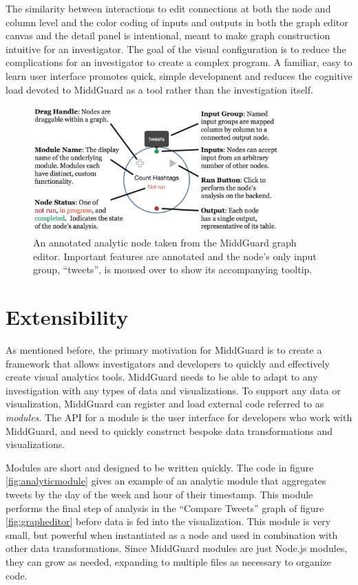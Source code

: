 \documentclass[midd]{thesis}
\begin{document}
The similarity between interactions to edit connections at both the node and
column level and the color coding of inputs and outputs in both the graph editor
canvas and the detail panel is intentional, meant to make graph construction
intuitive for an investigator. The goal of the visual configuration is to reduce
the complications for an investigator to create a complex program. A familiar,
easy to learn user interface promotes quick, simple development and reduces the
cognitive load devoted to MiddGuard as a tool rather than the investigation
itself.

\begin{figure}[!ht]
  \centering
  \includegraphics[width=0.85\textwidth]{middguard-analytic-node-annotated}
  \caption[An annotated analytic node.]{An annotated analytic node taken from
  the MiddGuard graph editor. Important features are annotated and the node's
  only input group, ``tweets'', is moused over to show its accompanying
  tooltip.}
  \label{fig:annotatednode}
\end{figure}

\section{Extensibility}

As mentioned before, the primary motivation for MiddGuard is to create a
framework that allows investigators and developers to quickly and effectively
create visual analytics tools. MiddGuard needs to be able to adapt to any
investigation with any types of data and visualizations. To support any data or
visualization, MiddGuard can register and load external code referred to as
\textit{modules}. The API for a module is the user interface for developers who
work with MiddGuard, and need to quickly construct bespoke data transformations
and visualizations.

Modules are short and designed to be written quickly. The code in figure
\ref{fig:analyticmodule} gives an example of an analytic module that aggregates
tweets by the day of the week and hour of their timestamp. This module performs
the final step of analysis in the ``Compare Tweets'' graph of figure
\ref{fig:grapheditor} before data is fed into the visualization. This module is
very small, but powerful when instantiated as a node and used in combination
with other data transformations. Since MiddGuard modules are just Node.js
modules, they can grow as needed, expanding to multiple files as necessary to
organize code.
\end{document}
